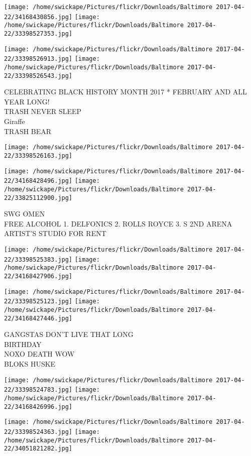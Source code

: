 \documentclass[10pt,letterpaper]{article}
\begin{document}
\texttt{[image: /home/swickape/Pictures/flickr/Downloads/Baltimore 2017-04-22/34168430856.jpg]}
\texttt{[image: /home/swickape/Pictures/flickr/Downloads/Baltimore 2017-04-22/33398527353.jpg]}

\texttt{[image: /home/swickape/Pictures/flickr/Downloads/Baltimore 2017-04-22/33398526913.jpg]}
\texttt{[image: /home/swickape/Pictures/flickr/Downloads/Baltimore 2017-04-22/33398526543.jpg]}

CELEBRATING BLACK HISTORY MONTH 2017 * FEBRUARY AND ALL YEAR LONG!\\
TRASH NEVER SLEEP\\
Giraffe\\
TRASH BEAR
\pagebreak

\texttt{[image: /home/swickape/Pictures/flickr/Downloads/Baltimore 2017-04-22/33398526163.jpg]}

\vspace{0.25in}
\texttt{[image: /home/swickape/Pictures/flickr/Downloads/Baltimore 2017-04-22/34168428496.jpg]}
\texttt{[image: /home/swickape/Pictures/flickr/Downloads/Baltimore 2017-04-22/33825112900.jpg]}

SWG OMEN\\
FREE ALCOHOL 1. DELFONICS 2. ROLLS ROYCE 3. S 2ND ARENA\\
ARTIST'S STUDIO FOR RENT
\pagebreak

\texttt{[image: /home/swickape/Pictures/flickr/Downloads/Baltimore 2017-04-22/33398525383.jpg]}
\texttt{[image: /home/swickape/Pictures/flickr/Downloads/Baltimore 2017-04-22/34168427906.jpg]}

\texttt{[image: /home/swickape/Pictures/flickr/Downloads/Baltimore 2017-04-22/33398525123.jpg]}
\texttt{[image: /home/swickape/Pictures/flickr/Downloads/Baltimore 2017-04-22/34168427446.jpg]}

GANGSTAS DON'T LIVE THAT LONG\\
BIRTHDAY\\
NOXO DEATH WOW\\
BLOKS HUSKE
\pagebreak

\texttt{[image: /home/swickape/Pictures/flickr/Downloads/Baltimore 2017-04-22/33398524783.jpg]}
\texttt{[image: /home/swickape/Pictures/flickr/Downloads/Baltimore 2017-04-22/34168426996.jpg]}

\texttt{[image: /home/swickape/Pictures/flickr/Downloads/Baltimore 2017-04-22/33398524363.jpg]}
\texttt{[image: /home/swickape/Pictures/flickr/Downloads/Baltimore 2017-04-22/34051821282.jpg]}
\end{document}
